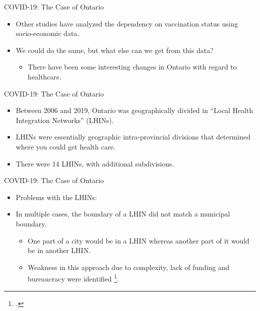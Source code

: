 \documentclass[
  ignorenonframetext,
]{beamer}
\providecommand{\tightlist}{%
  \setlength{\itemsep}{0pt}\setlength{\parskip}{0pt}}\usepackage{longtable,booktabs,array}
\begin{document}
\begin{frame}{COVID-19: The Case of Ontario}
\protect\hypertarget{covid-19-the-case-of-ontario-2}{}
\begin{itemize}[<+->]
\item
  Other studies have analyzed the dependency on vaccination status using
  socio-economic data.
\item
  We could do the same, but what else can we get from this data?

  \begin{itemize}[<+->]
  \tightlist
  \item
    There have been some interesting changes in Ontario with regard to
    healthcare.
  \end{itemize}
\end{itemize}
\end{frame}

\begin{frame}{COVID-19: The Case of Ontario}
\protect\hypertarget{covid-19-the-case-of-ontario-3}{}
\begin{itemize}[<+->]
\item
  Between 2006 and 2019, Ontario was geographically divided in ``Local
  Health Integration Networks'' (LHINs).
\item
  LHINs were essentially geographic intra-provincial divisions that
  determined where you could get health care.
\item
  There were 14 LHINs, with additional subdivisions.
\end{itemize}
\end{frame}

\begin{frame}{COVID-19: The Case of Ontario}
\protect\hypertarget{covid-19-the-case-of-ontario-4}{}
\begin{itemize}[<+->]
\item
  Problems with the LHINs:
\item
  In multiple cases, the boundary of a LHIN did not match a municipal
  boundary.

  \begin{itemize}[<+->]
  \item
    One part of a city would be in a LHIN whereas another part of it
    would be in another LHIN.
  \item
    Weakness in this approach due to complexity, lack of funding and
    bureaucracy were identified \footcite{tsasis2012}.
  \end{itemize}
\end{itemize}
\end{frame}
\end{document}
